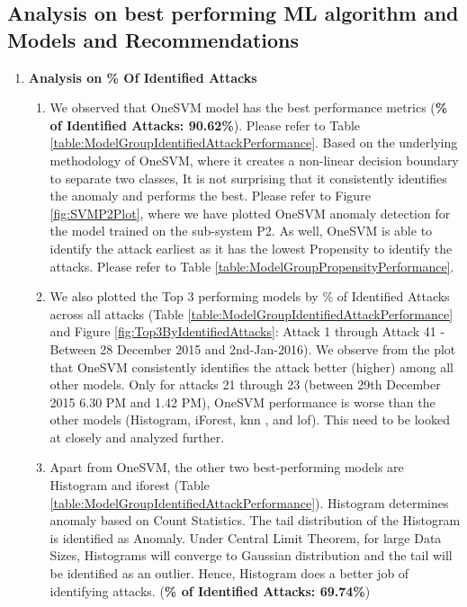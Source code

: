 \documentclass{article}
\begin{document}
\subsection{Analysis on best performing ML algorithm and Models and Recommendations}
    \begin{enumerate}
        \item \textbf{Analysis on \% Of Identified Attacks}
        \begin{enumerate}
            
            \item We observed that OneSVM model has the best performance metrics (\textbf{\% of Identified Attacks: 90.62\%}). Please refer to Table  \ref{table:ModelGroupIdentifiedAttackPerformance}. Based on the underlying methodology of OneSVM, where it creates a non-linear decision boundary to separate two classes, It is not surprising that it consistently identifies the anomaly and performs the best. Please refer to Figure \ref{fig:SVMP2Plot}, where we have plotted OneSVM anomaly detection for the model trained on the sub-system P2. As well, OneSVM is able to identify the attack earliest as it has the lowest Propensity to identify the attacks. Please refer to Table \ref{table:ModelGroupPropensityPerformance}.
        
            \item We also plotted the Top 3 performing models by \% of Identified Attacks across all attacks (Table \ref{table:ModelGroupIdentifiedAttackPerformance} and Figure \ref{fig:Top3ByIdentifiedAttacks}: Attack 1 through Attack 41 - Between 28 December 2015 and 2nd-Jan-2016). We observe from the plot that OneSVM consistently identifies the attack better (higher) among all other models. Only for attacks 21 through 23 (between 29th December 2015 6.30 PM and 1.42 PM), OneSVM performance is worse than the  other models (Histogram, iForest, knn , and lof). This need to be looked at closely and analyzed further.
    
            \item Apart from OneSVM, the other two best-performing models are Histogram and iforest (Table \ref{table:ModelGroupIdentifiedAttackPerformance}). Histogram determines anomaly based on Count Statistics. The tail distribution of the Histogram is identified as Anomaly. Under Central Limit Theorem, for large Data Sizes, Histograms will converge to Gaussian distribution and the tail will be identified as an outlier. Hence, Histogram does a better job of identifying attacks. (\textbf{\% of Identified Attacks: 69.74\%})
    

\end{enumerate}
\end{enumerate}
\end{document}
